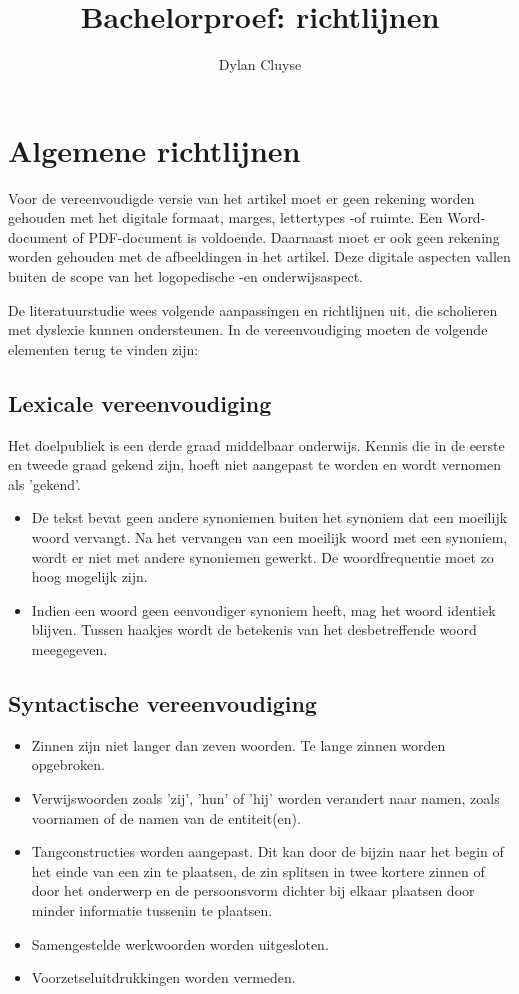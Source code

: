 \documentclass{report}
\title{Bachelorproef: richtlijnen}
\author{Dylan Cluyse}
\begin{document}
	\chapter{Algemene richtlijnen}
	Voor de vereenvoudigde versie van het artikel moet er geen rekening worden gehouden met het digitale formaat, marges, lettertypes -of ruimte. Een Word-document of PDF-document is voldoende. Daarnaast moet er ook geen rekening worden gehouden met de afbeeldingen in het artikel. Deze digitale aspecten vallen buiten de scope van het logopedische -en onderwijsaspect. 
	
	\medspace
	
	De literatuurstudie wees volgende aanpassingen en richtlijnen uit, die scholieren met dyslexie kunnen ondersteunen. In de vereenvoudiging moeten de volgende elementen terug te vinden zijn:
	
	\section{Lexicale vereenvoudiging}
	
	Het doelpubliek is een derde graad middelbaar onderwijs. Kennis die in de eerste en tweede graad gekend zijn, hoeft niet aangepast te worden en wordt vernomen als 'gekend'.
	
	\begin{itemize}
		\item De tekst bevat geen andere synoniemen buiten het synoniem dat een moeilijk woord vervangt. Na het vervangen van een moeilijk woord met een synoniem, wordt er niet met andere synoniemen gewerkt. De woordfrequentie moet zo hoog mogelijk zijn.
		\item Indien een woord geen eenvoudiger synoniem heeft, mag het woord identiek blijven. Tussen haakjes wordt de betekenis van het desbetreffende woord meegegeven. 
		
	\end{itemize}
	
	\section{Syntactische vereenvoudiging}
	\begin{itemize}
		\item Zinnen zijn niet langer dan zeven woorden. Te lange zinnen worden opgebroken.
		\item Verwijswoorden zoals 'zij', 'hun' of 'hij' worden verandert naar namen, zoals voornamen of de namen van de entiteit(en). 
		\item Tangconstructies worden aangepast. Dit kan door de bijzin naar het begin of het einde van een zin te plaatsen, de zin splitsen in twee kortere zinnen of door het onderwerp en de persoonsvorm dichter bij elkaar plaatsen door minder informatie tussenin te plaatsen.
		\item Samengestelde werkwoorden worden uitgesloten.
		\item Voorzetseluitdrukkingen worden vermeden.
	\end{itemize}
\end{document}
